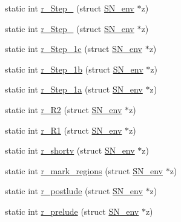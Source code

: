\begin{DoxyCompactItemize}
static int \mbox{\hyperlink{namespaceirk_1_1porter2_a135efd50dec58aa9ed79b275b9a2a33a}{r\+\_\+\+Step\+\_}} (struct \mbox{\hyperlink{structirk_1_1porter2_1_1SN__env}{S\+N\+\_\+env}} $\ast$z)
\item 
static int \mbox{\hyperlink{namespaceirk_1_1porter2_aa1fc1eaf0ce9fd2ba0dfa5545fc47b92}{r\+\_\+\+Step\+\_}} (struct \mbox{\hyperlink{structirk_1_1porter2_1_1SN__env}{S\+N\+\_\+env}} $\ast$z)
\item 
static int \mbox{\hyperlink{namespaceirk_1_1porter2_a3b945a90f1988bf077a95143cd9601b9}{r\+\_\+\+Step\+\_\+1c}} (struct \mbox{\hyperlink{structirk_1_1porter2_1_1SN__env}{S\+N\+\_\+env}} $\ast$z)
\item 
static int \mbox{\hyperlink{namespaceirk_1_1porter2_a22e0aa687b75708b6a957fabd70db64b}{r\+\_\+\+Step\+\_\+1b}} (struct \mbox{\hyperlink{structirk_1_1porter2_1_1SN__env}{S\+N\+\_\+env}} $\ast$z)
\item 
static int \mbox{\hyperlink{namespaceirk_1_1porter2_a40325a296d2224144345cd3b89359e03}{r\+\_\+\+Step\+\_\+1a}} (struct \mbox{\hyperlink{structirk_1_1porter2_1_1SN__env}{S\+N\+\_\+env}} $\ast$z)
\item 
static int \mbox{\hyperlink{namespaceirk_1_1porter2_a05acbed08c057a00c75b37dc709ab974}{r\+\_\+\+R2}} (struct \mbox{\hyperlink{structirk_1_1porter2_1_1SN__env}{S\+N\+\_\+env}} $\ast$z)
\item 
static int \mbox{\hyperlink{namespaceirk_1_1porter2_a93703530c79a7dc89bc7b454ae09cd0c}{r\+\_\+\+R1}} (struct \mbox{\hyperlink{structirk_1_1porter2_1_1SN__env}{S\+N\+\_\+env}} $\ast$z)
\item 
static int \mbox{\hyperlink{namespaceirk_1_1porter2_a2373ac936714623a8337e05fd47a6dfb}{r\+\_\+shortv}} (struct \mbox{\hyperlink{structirk_1_1porter2_1_1SN__env}{S\+N\+\_\+env}} $\ast$z)
\item 
static int \mbox{\hyperlink{namespaceirk_1_1porter2_aaaf3cfadd0a372283ee0169ebbdfc4e4}{r\+\_\+mark\+\_\+regions}} (struct \mbox{\hyperlink{structirk_1_1porter2_1_1SN__env}{S\+N\+\_\+env}} $\ast$z)
\item 
static int \mbox{\hyperlink{namespaceirk_1_1porter2_aac8e0e15ec42bcc7aca30bbecfb09079}{r\+\_\+postlude}} (struct \mbox{\hyperlink{structirk_1_1porter2_1_1SN__env}{S\+N\+\_\+env}} $\ast$z)
\item 
static int \mbox{\hyperlink{namespaceirk_1_1porter2_ab142e9cc255689a73a4330009ce374e7}{r\+\_\+prelude}} (struct \mbox{\hyperlink{structirk_1_1porter2_1_1SN__env}{S\+N\+\_\+env}} $\ast$z)
\item 

\end{DoxyCompactItemize}
